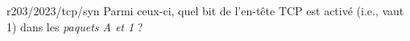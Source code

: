 \begin{question}{r203/2023/tcp/syn}
  Parmi ceux-ci, quel bit de l'en-tête TCP est activé (i.e., vaut 1)
  dans les {\em paquets A et 1} ?
  \begin{reponses}
  \end{reponses}
\end{question}
